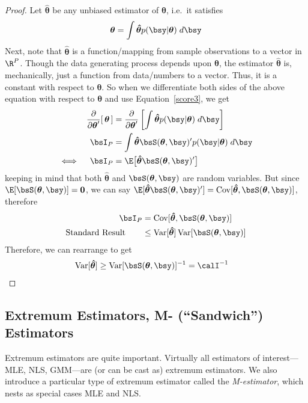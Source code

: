 \documentclass[12pt]{article}
\theoremstyle{plain}
\theoremstyle{definition}
\theoremstyle{remark}
\newcommand{\bstheta}{\boldsymbol{\theta}}
\newcommand{\bshattheta}{\boldsymbol{\hat{\theta}}}
\renewcommand{\bso}{\boldsymbol{0}}
\newcommand{\Cov}{\operatorname{Cov}}
\newcommand{\Var}{\operatorname{Var}}
\begin{document}
\begin{proof}
Let $\bshattheta$ be any unbiased estimator of $\bstheta$, i.e.\ it
satisfies
\begin{align*}
  \bstheta = \int \bshattheta p(\bsy|\bstheta) \; d\bsy
\end{align*}
Next, note that $\bshattheta$ is a function/mapping from sample
observations to a vector in $\R^P$. Though the data generating process
depends upon $\bstheta$, the estimator $\bshattheta$ is, mechanically,
just a function from data/numbers to a vector. Thus, it is a constant
with respect to $\bstheta$. So when we differentiate both sides of the
above equation with respect to $\bstheta$ and use Equation~\ref{score3},
we get
\begin{align*}
  \frac{\partial}{\partial\bstheta'}
  [\,
  \bstheta
  \,]
  &=
  \frac{\partial}{\partial\bstheta'}
  \left[
  \int \bshattheta p(\bsy|\bstheta) \; d\bsy
  \right]
  \\
  \bsI_P
  &= \int \bshattheta \bsS(\bstheta,\bsy)' p(\bsy|\bstheta)\; d\bsy \\
  \iff\quad
  \bsI_P
  &= \E\big[\bshattheta \bsS(\bstheta,\bsy)'\big]
\end{align*}
keeping in mind that both $\bshattheta$ and $\bsS(\bstheta,\bsy)$ are
random variables. But since $\E[\bsS(\bstheta,\bsy)]=\bso$, we can say
$\E[\bshattheta \bsS(\bstheta,\bsy)'] =
\Cov[\bshattheta,\bsS(\bstheta,\bsy)]$, therefore
\begin{align*}
  \bsI_P &=
  \Cov[\bshattheta,\bsS(\bstheta,\bsy)]
  \\
  \text{Standard Result} \qquad
  &\leq
  \Var[\bshattheta]\Var[\bsS(\bstheta,\bsy)]
\end{align*}
Therefore, we can rearrange to get
\begin{align*}
  \Var[\bshattheta]
  &\geq
  \Var[\bsS(\bstheta,\bsy)]^{-1}
  =\calI^{-1}
\end{align*}
\end{proof}


\clearpage
\subsection{Extremum Estimators, M- (``Sandwich'') Estimators}

Extremum estimators are quite important. Virtually all estimators of
interest---MLE, NLS, GMM---are (or can be cast as) extremum
estimators. We also introduce a particular type of extremum estimator
called the \emph{M-estimator}, which nests as special cases MLE and
NLS.
\end{document}
